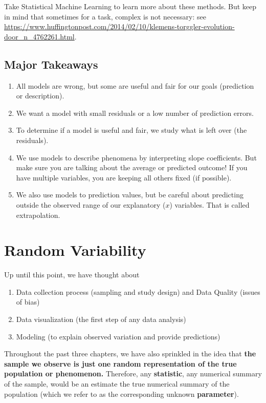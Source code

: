 \documentclass[]{book}
\providecommand{\tightlist}{%
  \setlength{\itemsep}{0pt}\setlength{\parskip}{0pt}}
\begin{document}
Take Statistical Machine Learning to learn more about these methods. But keep in mind that sometimes for a task, complex is not necessary: see \url{https://www.huffingtonpost.com/2014/02/10/klemens-torggler-evolution-door_n_4762261.html}.

\hypertarget{major-takeaways-2}{%
\section{Major Takeaways}\label{major-takeaways-2}}

\begin{enumerate}
\def\labelenumi{\arabic{enumi}.}
\item
  All models are wrong, but some are useful and fair for our goals (prediction or description).
\item
  We want a model with small residuals or a low number of prediction errors.
\item
  To determine if a model is useful and fair, we study what is left over (the residuals).
\item
  We use models to describe phenomena by interpreting slope coefficients. But make sure you are talking about the average or predicted outcome! If you have multiple variables, you are keeping all others fixed (if possible).
\item
  We also use models to prediction values, but be careful about predicting outside the observed range of our explanatory (\(x\)) variables. That is called extrapolation.
\end{enumerate}

\hypertarget{random-variability}{%
\chapter{Random Variability}\label{random-variability}}

Up until this point, we have thought about

\begin{enumerate}
\def\labelenumi{\arabic{enumi}.}
\tightlist
\item
  Data collection process (sampling and study design) and Data Quality (issues of bias)
\item
  Data visualization (the first step of any data analysis)
\item
  Modeling (to explain observed variation and provide predictions)
\end{enumerate}

Throughout the past three chapters, we have also sprinkled in the idea that \textbf{the sample we observe is just one random representation of the true population or phenomenon.} Therefore, any \textbf{statistic}, any numerical summary of the sample, would be an estimate the true numerical summary of the population (which we refer to as the corresponding unknown \textbf{parameter}).
\end{document}

